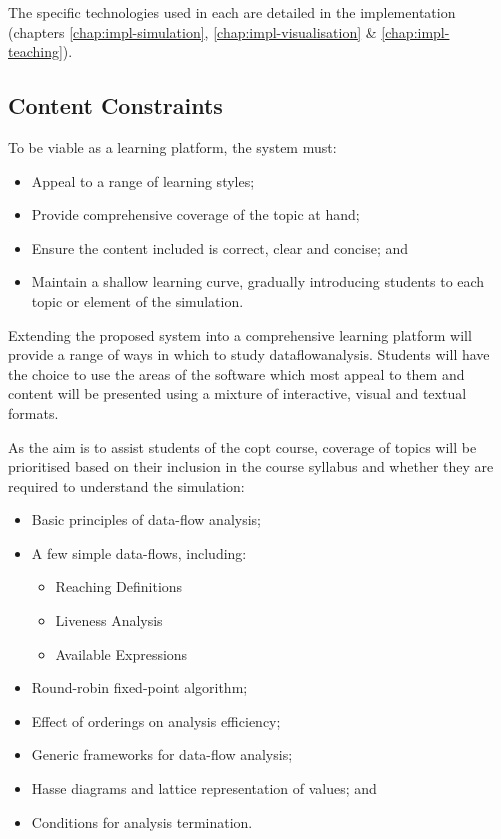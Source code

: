 \documentclass[bsc,twoside,singlespacing,parskip,logo,notimes,normalheadings]{infthesis}
\begin{document}
        The specific technologies used in each are detailed in
        the implementation (chapters \ref{chap:impl-simulation},
        \ref{chap:impl-visualisation} \& \ref{chap:impl-teaching}).

          
        \subsection{Content Constraints}
        To be viable as a learning platform, the system must:
        
        \begin{itemize}
        \item Appeal to a range of learning styles;
        \item Provide comprehensive coverage of the topic at hand;
        \item Ensure the content included is correct, clear and
          concise; and
        \item Maintain a shallow learning curve, gradually introducing
          students to each topic or element of the simulation.
        \end{itemize}

        Extending the proposed system into a comprehensive learning
        platform will provide a range of ways in which to study
        \gls{dataflowanalysis}. Students will have the choice to use
        the areas of the software which most appeal to them and
        content will be presented using a mixture of interactive,
        visual and textual formats.

        As the aim is to assist students of the \gls{copt} course,
        coverage of topics will be prioritised based on their
        inclusion in the course syllabus and whether they are required
        to understand the simulation:

        \begin{itemize}
        \item Basic principles of data-flow analysis;
        \item A few simple data-flows, including:
          \begin{itemize}
          \item Reaching Definitions
          \item Liveness Analysis
          \item Available Expressions
          \end{itemize}
        \item Round-robin fixed-point algorithm;
        \item Effect of orderings on analysis efficiency;
        \item Generic frameworks for data-flow analysis;
        \item Hasse diagrams and lattice representation of values; and
        \item Conditions for analysis termination.
        \end{itemize}        
\end{document}
